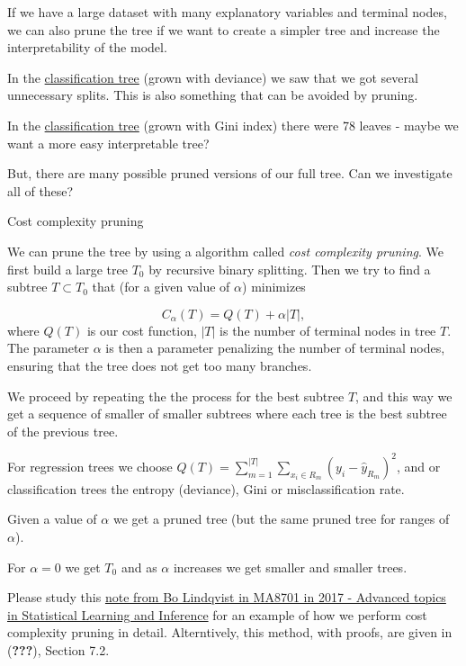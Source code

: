 \documentclass[10pt,ignorenonframetext,]{beamer}
\begin{document}
\begin{frame}

If we have a large dataset with many explanatory variables and terminal
nodes, we can also prune the tree if we want to create a simpler tree
and increase the interpretability of the model.

In the \href{classtree2}{classification tree} (grown with deviance) we
saw that we got several unnecessary splits. This is also something that
can be avoided by pruning.

In the \href{classtree3}{classification tree} (grown with Gini index)
there were 78 leaves - maybe we want a more easy interpretable tree?

But, there are many possible pruned versions of our full tree. Can we
investigate all of these?

\end{frame}

\begin{frame}

\begin{block}{Cost complexity pruning}

We can prune the tree by using a algorithm called \emph{cost complexity
pruning}. We first build a large tree \(T_0\) by recursive binary
splitting. Then we try to find a subtree \(T\subset T_0\) that (for a
given value of \(\alpha\)) minimizes

\[
C_{\alpha}(T)=Q(T)+\alpha |T|,
\] where \(Q(T)\) is our cost function, \(|T|\) is the number of
terminal nodes in tree \(T\). The parameter \(\alpha\) is then a
parameter penalizing the number of terminal nodes, ensuring that the
tree does not get too many branches.

We proceed by repeating the the process for the best subtree \(T\), and
this way we get a sequence of smaller of smaller subtrees where each
tree is the best subtree of the previous tree.

For regression trees we choose
\(Q(T)=\sum_{m=1}^{|T|}\sum_{x_i\in R_m}(y_i - \hat{y}_{R_m})^2\), and
or classification trees the entropy (deviance), Gini or
misclassification rate.

\end{block}

\end{frame}

\begin{frame}

Given a value of \(\alpha\) we get a pruned tree (but the same pruned
tree for ranges of \(\alpha\)).

For \(\alpha=0\) we get \(T_0\) and as \(\alpha\) increases we get
smaller and smaller trees.

Please study this
\href{https://www.math.ntnu.no/emner/TMA4268/2018v/notes/CART1MA87012017BoLindqvist.pdf}{note
from Bo Lindqvist in MA8701 in 2017 - Advanced topics in Statistical
Learning and Inference} for an example of how we perform cost complexity
pruning in detail. Alterntively, this method, with proofs, are given in
({\textbf{???}}), Section 7.2.

\end{frame}
\end{document}
